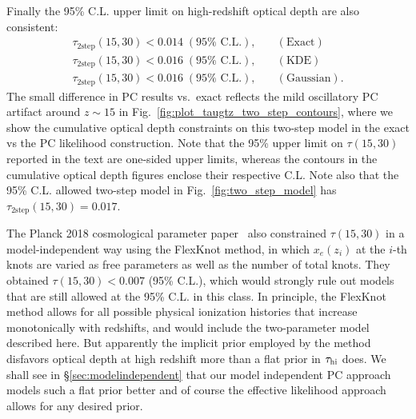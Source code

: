 \documentclass[aps,prd,twocolumn,amsmath,amssymb,showpacs,floatfix,superscriptaddress,nofootinbib]{revtex4-1}
\begin{document}
Finally the 95\% C.L. upper limit on high-redshift optical depth are also consistent:
%
\begin{align}
\tau_{2\text{step}}(15, 30) < 0.014\; (95\% \text{ C.L.}), & \quad (\text{Exact}) \nonumber\\
\tau_{2\text{step}}(15, 30) < 0.016\; (95\% \text{ C.L.}), & \quad (\text{KDE}) \nonumber\\
\tau_{2\text{step}}(15, 30) < 0.016\; (95\% \text{ C.L.}), & \quad (\text{Gaussian}).
\label{eq:2stepbound}
\end{align}
%
The small difference in PC results vs.~exact reflects the mild oscillatory PC artifact around $z\sim 15$ in Fig.~\ref{fig:plot_taugtz_two_step_contours}, where we show the cumulative optical depth constraints on this two-step model in the exact vs the PC likelihood construction. Note that the 95\% upper limit on $\tau(15, 30)$ reported in the text are one-sided upper limits, whereas the contours in the cumulative optical depth figures enclose their respective C.L.
Note also that the 95\% C.L. allowed two-step model in 
Fig.~\ref{fig:two_step_model} has
$\tau_{2\text{step}}(15,30)= 0.017$.

The Planck 2018 cosmological parameter paper~\cite{Aghanim:2018eyx} also constrained $\tau(15, 30)$ in a model-independent way using the FlexKnot method, in which $x_e(z_i)$ at the $i$-th knots are varied as free parameters as well as the number of total knots. They obtained $\tau(15, 30) < 0.007$ (95\% C.L.), which would strongly rule out models that are still allowed at the 95\% C.L. in this class. 
In principle, the FlexKnot method allows for all possible physical ionization histories that increase monotonically with redshifts, and would include the two-parameter model described here. But apparently the implicit prior employed by the method disfavors optical depth at high redshift more than a flat prior in 
$\tau_{\rm hi}$ does.  We shall see in \S \ref{sec:modelindependent} that our model independent PC approach models such a flat prior better and of course the effective likelihood approach allows for any desired prior.
\end{document}
